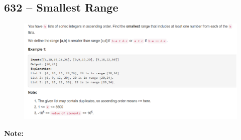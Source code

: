 \documentclass[a4paper,12pt]{article}
\begin{document}
\subsection{632 -- Smallest Range}
\begin{figure}[H]
	\begin{center}
		\includegraphics[width=18cm]{632.png}
	\end{center}
\end{figure}
\textbf{\large{Note:}}
\par
\vspace{0.5em}
\noindent
\end{document}
